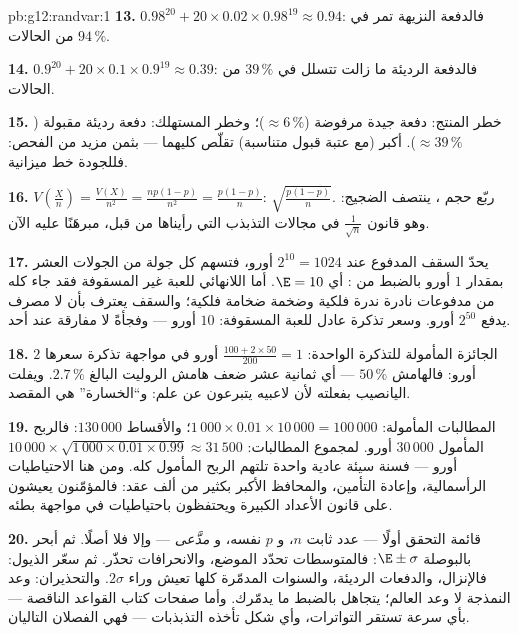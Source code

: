 \begin{solution}{pb:g12:randvar:1}
\textbf{13.} $0.98^{20} + 20 \times 0.02 \times 0.98^{19}
\approx 0.94$: فالدفعة النزيهة تمر في $94\,\%$ من الحالات.

\textbf{14.} $0.9^{20} + 20 \times 0.1 \times 0.9^{19}
\approx 0.39$: فالدفعة الرديئة ما زالت تتسلل في $39\,\%$ من
الحالات.

\textbf{15.} خطر المنتج: دفعة جيدة مرفوضة
($\approx 6\,\%$)؛ وخطر المستهلك: دفعة رديئة مقبولة
($\approx 39\,\%$).  أكبر (مع عتبة قبول
متناسبة) تقلّص كليهما --- بثمن مزيد من
الفحص: فللجودة خط ميزانية.

\textbf{16.} $V\!\left(\frac Xn\right) = \frac{V(X)}{n^2} =
\frac{np(1-p)}{n^2} = \frac{p(1-p)}{n}$: 
$\sqrt{\frac{p(1-p)}{n}}$. ربّع حجم ، ينتصف
الضجيج: وهو قانون $\frac{1}{\sqrt n}$ في مجالات التذبذب
التي رأيناها من قبل، مبرهَنًا عليه الآن.

\textbf{17.} يحدّ السقف المدفوع عند $2^{10} = 1024$
أورو، فتسهم كل جولة من الجولات العشر بمقدار $1$ أورو بالضبط
من : أي $\E = 10$. أما  اللانهائي للعبة
غير المسقوفة فقد جاء كله من مدفوعات نادرة ندرة فلكية
وضخمة ضخامة فلكية؛ والسقف يعترف بأن لا مصرف
يدفع $2^{50}$ أورو. وسعر تذكرة عادل للعبة المسقوفة:
$10$ أورو --- وفجأةً لا مفارقة عند أحد.

\textbf{18.} الجائزة المأمولة للتذكرة الواحدة:
$\frac{100 + 2 \times 50}{200} = 1$ أورو في مواجهة تذكرة سعرها $2$
أورو: فالهامش $50\,\%$ --- أي ثمانية عشر ضعف هامش الروليت
البالغ $2.7\,\%$. ويفلت اليانصيب بفعلته لأن لاعبيه
يتبرعون عن علم: و``الخسارة'' هي المقصد.

\textbf{19.} المطالبات المأمولة: $1\,000 \times 0.01 \times
10\,000 = 100\,000$؛ والأقساط $130\,000$: فالربح المأمول
$30\,000$ أورو.  لمجموع المطالبات:
$10\,000 \times \sqrt{1\,000 \times 0.01 \times 0.99}
\approx 31\,500$ أورو --- فسنة سيئة عادية واحدة تلتهم
الربح المأمول كله. ومن هنا الاحتياطيات الرأسمالية، وإعادة التأمين،
والمحافظ الأكبر بكثير من ألف عقد: فالمؤمّنون
يعيشون على قانون الأعداد الكبيرة ويحتفظون باحتياطيات في مواجهة
بطئه.

\textbf{20.} قائمة التحقق أولًا --- عدد ثابت $n$، و $p$ نفسه، و
 \emph{مدَّعى} --- وإلا فلا  أصلًا. ثم
أبحر بالبوصلة $\E \pm \sigma$: فالمتوسطات تحدّد الموضع، والانحرافات تحذّر.
ثم سعّر الذيول: فالإنزال، والدفعات الرديئة، والسنوات المدمّرة كلها
تعيش وراء $2\sigma$. والتحذيران:  وعد
النمذجة لا وعد العالم؛  يتجاهل بالضبط
ما يدمّرك. وأما صفحات كتاب القواعد الناقصة --- بأي سرعة
تستقر التواترات، وأي شكل تأخذه التذبذبات ---
فهي الفصلان التاليان.
\end{solution}
